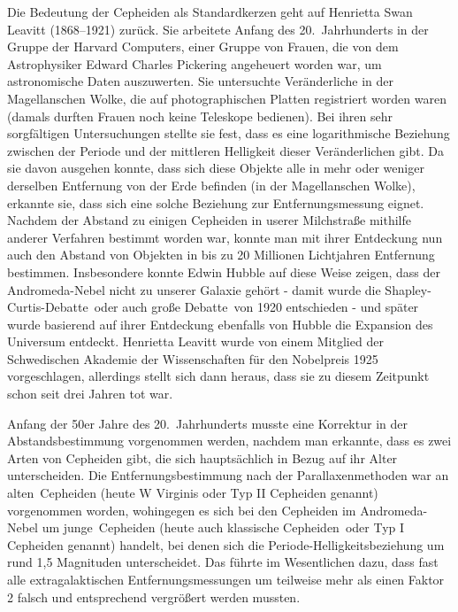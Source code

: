 Die Bedeutung der Cepheiden als Standardkerzen geht auf 
Henrietta Swan Leavitt (1868--1921) zur\"uck.
Sie arbeitete Anfang des 20.\ Jahrhunderts in der Gruppe der \glqq Harvard Computers\grqq, einer Gruppe
von Frauen, die von dem Astrophysiker Edward Charles Pickering angeheuert worden war, um 
astronomische Daten auszuwerten. Sie untersuchte Ver\"anderliche in der Magellanschen Wolke, die
auf photographischen Platten registriert worden waren (damals durften Frauen noch keine Teleskope bedienen). 
Bei ihren sehr sorgf\"altigen Untersuchungen stellte sie fest, dass es eine logarithmische Beziehung
zwischen der Periode und der mittleren Helligkeit dieser Ver\"anderlichen gibt. Da sie davon ausgehen
konnte, dass sich diese Objekte alle in mehr oder weniger derselben Entfernung von der Erde
befinden (in der Magellanschen Wolke), erkannte sie, dass sich eine solche Beziehung zur Entfernungsmessung
eignet. Nachdem der Abstand zu einigen Cepheiden in userer Milchstra\ss e mithilfe anderer Verfahren
bestimmt worden war, konnte man mit
ihrer Entdeckung nun auch den Abstand von Objekten in bis zu 20 Millionen Lichtjahren Entfernung
bestimmen. Insbesondere konnte Edwin Hubble auf diese Weise zeigen, dass der
Andromeda-Nebel nicht zu unserer Galaxie geh\"ort - damit wurde die \glqq Shapley-Curtis-Debatte\grqq\ oder
auch \grqq gro\ss e Debatte\grqq\ von 1920 entschieden - und sp\"ater wurde basierend auf ihrer
Entdeckung ebenfalls von Hubble die Expansion des Universum entdeckt. 
Henrietta Leavitt wurde von einem Mitglied der Schwedischen Akademie der 
Wissenschaften f\"ur den Nobelpreis 1925 vorgeschlagen, allerdings stellt sich dann heraus, dass sie
zu diesem Zeitpunkt schon seit drei Jahren tot war.  

Anfang der 50er Jahre des 20.\ Jahrhunderts musste eine Korrektur in der Abstandsbestimmung
vorgenommen werden, nachdem man erkannte, dass es zwei Arten von Cepheiden gibt, die sich
haupts\"achlich in Bezug auf ihr Alter unterscheiden. Die Entfernungsbestimmung nach der 
Parallaxenmethoden war an \glqq alten\grqq\ Cepheiden (heute W Virginis oder Typ II Cepheiden genannt) 
vorgenommen worden, wohingegen
es sich bei den Cepheiden im Andromeda-Nebel um \glqq junge\grqq\ Cepheiden (heute auch
\glqq klassische Cepheiden\grqq\ oder Typ I Cepheiden genannt) handelt, bei denen sich
die Periode-Helligkeitsbeziehung um rund 1,5 Magnituden unterscheidet. Das f\"uhrte im Wesentlichen
dazu, dass fast alle extragalaktischen Entfernungsmessungen um teilweise mehr als einen Faktor 2 falsch und entsprechend
vergr\"o\ss ert werden mussten.  

